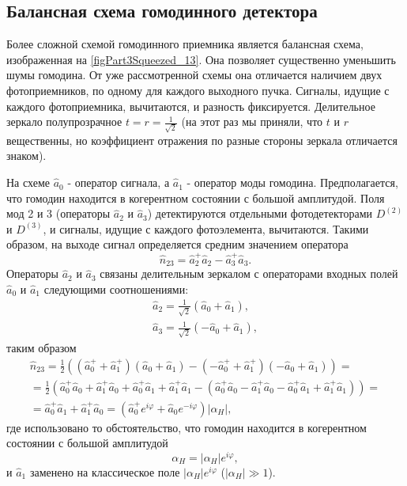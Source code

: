 

\subsection{Балансная схема гомодинного детектора}
Более сложной схемой гомодинного приемника является балансная схема,
изображенная на \autoref{figPart3Squeezed_13}. Она позволяет
существенно уменьшить шумы гомодина. От уже рассмотренной схемы она
отличается наличием двух фотоприемников, по одному для каждого
выходного пучка. Сигналы, идущие с каждого фотоприемника, вычитаются, и
разность фиксируется. Делительное зеркало полупрозрачное $t = r =
\frac{1}{\sqrt{2}}$ (на этот раз мы приняли, что $t$ и $r$
вещественны, но коэффициент отражения по разные стороны зеркала
отличается знаком).

На схеме $\hat{a}_0$ - оператор сигнала, а $\hat{a}_1$ - оператор моды
гомодина. Предполагается, что гомодин находится в когерентном
состоянии с большой амплитудой. Поля мод 2 и 3 (операторы $\hat{a}_2$
и $\hat{a}_3$) детектируются отдельными фотодетекторами $D^{(2)}$ и
$D^{(3)}$, и сигналы, идущие с каждого фотоэлемента, вычитаются. Такими
образом, на выходе сигнал определяется средним значением оператора
\begin{equation}
\hat{n}_{23} = \hat{a}_2^{+}\hat{a}_2 - 
\hat{a}_3^{+}\hat{a}_3.
\nonumber
\end{equation}
Операторы $\hat{a}_2$ и $\hat{a}_3$ связаны  делительным зеркалом с
операторами входных полей $\hat{a}_0$ и $\hat{a}_1$ следующими
соотношениями: 
\begin{eqnarray}
\hat{a}_2 = \frac{1}{\sqrt{2}} \left(\hat{a}_0 + \hat{a}_1\right),
\nonumber \\
\hat{a}_3 = \frac{1}{\sqrt{2}} \left(- \hat{a}_0 + \hat{a}_1\right),
\nonumber
\end{eqnarray}
таким образом
\begin{eqnarray}
\hat{n}_{23} = \frac{1}{2}
\left(
\left(\hat{a}_0^{+} + \hat{a}_1^{+}\right)
\left(\hat{a}_0 + \hat{a}_1\right)
-
\left(-\hat{a}_0^{+} + \hat{a}_1^{+}\right)
\left(-\hat{a}_0 + \hat{a}_1\right)
\right) = 
\nonumber \\
=
\frac{1}{2}
\left(
\hat{a}_0^{+}\hat{a}_0 + \hat{a}_1^{+}\hat{a}_0
+
\hat{a}_0^{+}\hat{a}_1 + \hat{a}_1^{+}\hat{a}_1
-
\left(
\hat{a}_0^{+}\hat{a}_0 - \hat{a}_1^{+}\hat{a}_0
-\hat{a}_0^{+}\hat{a}_1 + \hat{a}_1^{+}\hat{a}_1
\right)
\right) = 
\nonumber \\
=\hat{a}_0^{+}\hat{a}_1 + \hat{a}_1^{+}\hat{a}_0 = 
\left(
\hat{a}_0^{+}e^{i\varphi} + \hat{a}_0 e^{- i\varphi}
\right)\left|\alpha_H\right|,
\nonumber
\end{eqnarray}
где использовано то обстоятельство, что гомодин находится в
когерентном состоянии с большой амплитудой 
\[
\alpha_H = \left|\alpha_H\right|e^{i\varphi},
\]
и $\hat{a}_1$ заменено на классическое поле
$\left|\alpha_H\right|e^{i\varphi}$ ($\left|\alpha_H\right| \gg 1$).  


